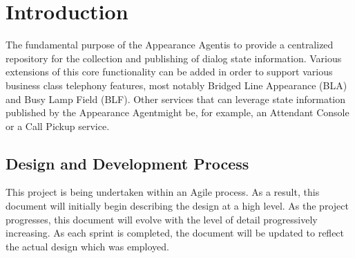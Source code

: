 \documentclass[twoside,11pt]{article}
\newcommand{\PAA}{Appearance Agent\space}
\begin{document}
\pagestyle{fancy}
\fancyhead{}
\fancyhead[RO,LE]{\thepage}
\fancyfoot{}
\renewcommand{\footrulewidth}{0.4pt}

\tableofcontents
\clearpage
\listoffigures
\lstlistoflistings
\clearpage

\pagestyle{fancy}
\fancyhead{}
\fancyhead[RO,LE]{\thepage}
\fancyfoot{}
\renewcommand{\footrulewidth}{0.4pt}


\section{Introduction}
The fundamental purpose of the \PAA is to provide a centralized repository for the collection and
publishing of dialog state information. Various extensions of this core functionality can be added
in order to support various business class telephony features, most notably Bridged Line Appearance
(BLA) and Busy Lamp Field (BLF). Other services that can leverage state information published by the
\PAA might be, for example, an Attendant Console or a Call Pickup service.

\subsection{Design and Development Process}
This project is being undertaken within an Agile process.  As a result, this document will initially
begin describing the design at a high level.  As the project progresses, this document will evolve
with the level of detail progressively increasing. As each sprint is completed, the document will be
updated to reflect the actual design which was employed.
\end{document}
